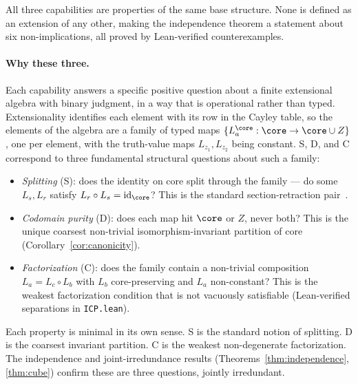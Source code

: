 All three capabilities are properties of the same base structure. None
is defined as an extension of any other, making the independence theorem
a statement about six non-implications, all proved by Lean-verified
counterexamples.

\paragraph{Why these three.} Each capability answers a specific positive
question about a finite extensional algebra with binary judgment, in a
way that is operational rather than typed. Extensionality identifies
each element with its row in the Cayley table, so the elements of the
algebra are a family of typed maps
$\{L_a^{\core} : \core \to \core \cup Z\}$, one per element, with the
truth-value maps $L_{z_1}, L_{z_2}$ being constant. S, D, and C
correspond to three fundamental structural questions about such a
family:
\begin{itemize}
  \item \emph{Splitting} (S): does the identity on core split through
    the family --- do some $L_s, L_r$ satisfy
    $L_r \circ L_s = \mathrm{id}_{\core}$? This is the standard
    section-retraction pair~\cite{maclane71}.
  \item \emph{Codomain purity} (D): does each map hit $\core$ or $Z$,
    never both? This is the unique coarsest non-trivial
    isomorphism-invariant partition of core
    (Corollary~\ref{cor:canonicity}).
  \item \emph{Factorization} (C): does the family contain a non-trivial
    composition $L_a = L_c \circ L_b$ with $L_b$ core-preserving and
    $L_a$ non-constant? This is the weakest factorization condition
    that is not vacuously satisfiable (Lean-verified separations in
    \texttt{ICP.lean}).
\end{itemize}
Each property is minimal in its own sense. S is the standard notion of
splitting. D is the coarsest invariant partition. C is the weakest
non-degenerate factorization. The independence and joint-irredundance
results (Theorems~\ref{thm:independence}, \ref{thm:cube}) confirm these
are three questions, jointly irredundant.

